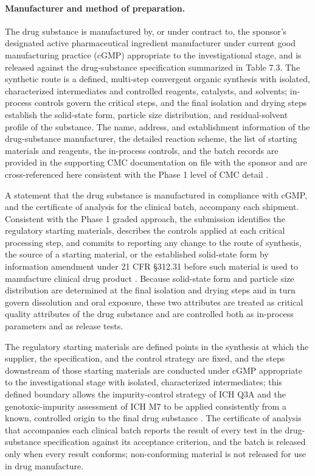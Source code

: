 \paragraph{Manufacturer and method of preparation.}
The drug substance is manufactured by, or under contract to, the sponsor's
designated active pharmaceutical ingredient manufacturer under current good
manufacturing practice (cGMP) appropriate to the investigational stage, and is
released against the drug-substance specification summarized in Table 7.3. The
synthetic route is a defined, multi-step convergent organic synthesis with
isolated, characterized intermediates and controlled reagents, catalysts, and
solvents; in-process controls govern the critical steps, and the final isolation
and drying steps establish the solid-state form, particle size distribution, and
residual-solvent profile of the substance. The name, address, and
establishment information of the drug-substance manufacturer, the detailed
reaction scheme, the list of starting materials and reagents, the in-process
controls, and the batch records are provided in the supporting CMC documentation
on file with the sponsor and are cross-referenced here consistent with the
Phase 1 level of CMC detail \cite{phase1guidance}. 

A statement that the drug
substance is manufactured in compliance with cGMP, and the certificate of
analysis for the clinical batch, accompany each shipment. Consistent with the
Phase 1 graded approach, the submission identifies the regulatory starting
materials, describes the controls applied at each critical processing step, and
commits to reporting any change to the route of synthesis, the source of a
starting material, or the established solid-state form by information amendment
under 21 CFR \S 312.31 before such material is used to manufacture clinical drug
product \cite{phase1guidance}. Because solid-state form and particle size
distribution are determined at the final isolation and drying steps and in turn
govern dissolution and oral exposure, these two attributes are treated as
critical quality attributes of the drug substance and are controlled both as
in-process parameters and as release tests. 

The regulatory starting materials are
defined points in the synthesis at which the supplier, the specification, and the
control strategy are fixed, and the steps downstream of those starting materials
are conducted under cGMP appropriate to the investigational stage with isolated,
characterized intermediates; this defined boundary allows the impurity-control
strategy of ICH Q3A and the genotoxic-impurity assessment of ICH M7 to be applied
consistently from a known, controlled origin to the final drug substance
\cite{ichpaistduni}. The certificate of analysis that accompanies each clinical
batch reports the result of every test in the drug-substance specification against
its acceptance criterion, and the batch is released only when every result
conforms; non-conforming material is not released for use in drug
manufacture.

